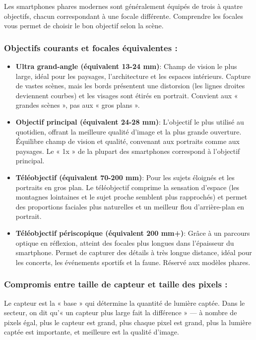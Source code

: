 
Les smartphones phares modernes sont généralement équipés de trois à quatre objectifs, chacun correspondant à une focale différente. Comprendre les focales vous permet de choisir le bon objectif selon la scène.

\subsubsection*{Objectifs courants et focales équivalentes :}

\begin{itemize}
  \item \textbf{Ultra grand-angle (équivalent 13-24 mm)}: Champ de vision le plus large, idéal pour les paysages, l'architecture et les espaces intérieurs. Capture de vastes scènes, mais les bords présentent une distorsion (les lignes droites deviennent courbes) et les visages sont étirés en portrait. Convient aux « grandes scènes », pas aux « gros plans ».
  \item \textbf{Objectif principal (équivalent 24-28 mm)}: L'objectif le plus utilisé au quotidien, offrant la meilleure qualité d'image et la plus grande ouverture. Équilibre champ de vision et qualité, convenant aux portraits comme aux paysages. Le « 1x » de la plupart des smartphones correspond à l'objectif principal.
  \item \textbf{Téléobjectif (équivalent 70-200 mm)}: Pour les sujets éloignés et les portraits en gros plan. Le téléobjectif comprime la sensation d'espace (les montagnes lointaines et le sujet proche semblent plus rapprochés) et permet des proportions faciales plus naturelles et un meilleur flou d'arrière-plan en portrait.
  \item \textbf{Téléobjectif périscopique (équivalent 200 mm+)}: Grâce à un parcours optique en réflexion, atteint des focales plus longues dans l'épaisseur du smartphone. Permet de capturer des détails à très longue distance, idéal pour les concerts, les événements sportifs et la faune. Réservé aux modèles phares.
\end{itemize}

\subsubsection*{Compromis entre taille de capteur et taille des pixels :}

Le capteur est la « base » qui détermine la quantité de lumière captée. Dans le secteur, on dit qu'« un capteur plus large fait la différence » — à nombre de pixels égal, plus le capteur est grand, plus chaque pixel est grand, plus la lumière captée est importante, et meilleure est la qualité d'image.

